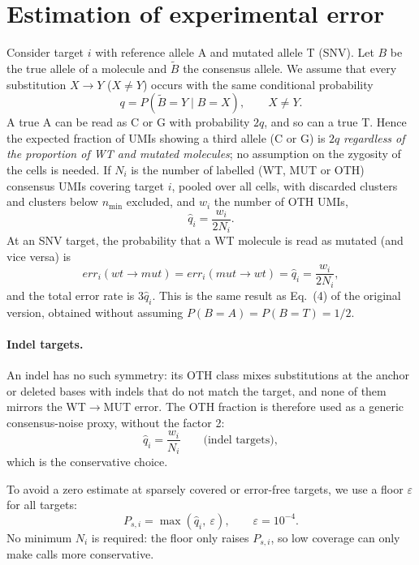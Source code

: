 \documentclass[11pt]{article}
\begin{document}
\section{Estimation of experimental error}

Consider target $i$ with reference allele A and mutated allele T (SNV). Let $B$ be the true allele of a molecule and $\tilde B$ the consensus allele. We assume that every substitution $X \to Y$ ($X\neq Y$) occurs with the same conditional probability
\begin{equation}
q = P(\tilde B = Y \mid B = X), \qquad X \neq Y .
\end{equation}
A true A can be read as C or G with probability $2q$, and so can a true T. Hence the expected fraction of UMIs showing a third allele (C or G) is $2q$ \emph{regardless of the proportion of WT and mutated molecules}; no assumption on the zygosity of the cells is needed. If $N_i$ is the number of labelled (WT, MUT or OTH) consensus UMIs covering target $i$, pooled over all cells, with discarded clusters and clusters below $n_{\min}$ excluded, and $w_i$ the number of OTH UMIs,
\begin{equation}
\hat q_i = \frac{w_i}{2N_i}.
\end{equation}
At an SNV target, the probability that a WT molecule is read as mutated (and vice versa) is
\begin{equation}
err_i(wt \to mut) = err_i(mut \to wt) = \hat q_i = \frac{w_i}{2N_i},
\end{equation}
and the total error rate is $3\hat q_i$. This is the same result as Eq.~(4) of the original version, obtained without assuming $P(B=A)=P(B=T)=1/2$.

\paragraph{Indel targets.} An indel has no such symmetry: its OTH class mixes substitutions at the anchor or deleted bases with indels that do not match the target, and none of them mirrors the WT$\to$MUT error. The OTH fraction is therefore used as a generic consensus-noise proxy, without the factor 2:
\begin{equation}
\hat q_i = \frac{w_i}{N_i} \qquad \text{(indel targets)},
\end{equation}
which is the conservative choice.

To avoid a zero estimate at sparsely covered or error-free targets, we use a floor $\varepsilon$ for all targets:
\begin{equation}
P_{s,i} = \max(\hat q_i,\ \varepsilon), \qquad \varepsilon = 10^{-4}.
\end{equation}
No minimum $N_i$ is required: the floor only raises $P_{s,i}$, so low coverage can only make calls more conservative.
\end{document}
